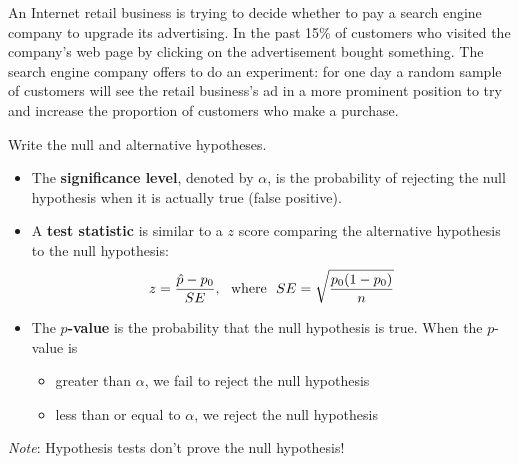 \documentclass[../mathNotesPreamble]{subfiles}
\begin{document}
    \begin{ex*}
      An Internet retail business is trying to decide whether to pay a search engine company to upgrade its advertising. In the past 15\% of customers who visited the company's web page by clicking on the advertisement bought something. %
      The search engine company offers to do an experiment: for one day a random sample of customers will see the retail business's ad in a more prominent position to try and increase the proportion of customers who make a purchase. 
      
      Write the null and alternative hypotheses.
    \end{ex*}
    \pagebreak
    
    \begin{defn*}
      \begin{itemize}
        \item The \textbf{significance level}, denoted by $\alpha$, is the probability of rejecting the null hypothesis when it is actually true (false positive).
        \item A \textbf{test statistic} is similar to a $z$ score comparing the alternative hypothesis to the null hypothesis:
          \[z=\frac{\hat{p}-p_0}{SE},\ \textnormal{ where }\  SE=\sqrt{\frac{p_0(1-p_0)}{n}}\]
        \item The \textbf{$p$-value} is the probability that the null hypothesis is true. When the $p$-value is
          \begin{itemize}
            \item greater than $\alpha$, we fail to reject the null hypothesis
            \item less than or equal to $\alpha$, we reject the null hypothesis
          \end{itemize}
      \end{itemize}
      \emph{Note}: Hypothesis tests don't prove the null hypothesis!
    \end{defn*}
    
    

  \pagebreak
\end{document}
